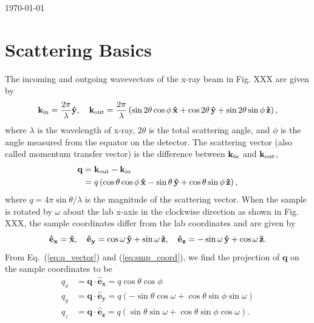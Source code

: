 \documentclass[12pt,letterpaper]{article}
\begin{document}
\today %
\section{Scattering Basics}
The incoming and outgoing wavevectors of the x-ray beam in Fig. XXX 
are given by
\begin{equation}
  \mathbf{k}_{\mathrm{in}} = \frac{2\pi}{\lambda} \mathbf{\hat{y}}, \quad
  \mathbf{k}_{\mathrm{out}} = 
    \frac{2\pi}{\lambda} \left( 
      \sin 2\theta \cos\phi \, \mathbf{\hat{x}}
      + \cos 2\theta \, \mathbf{\hat{y}}
      + \sin 2\theta \sin\phi \, \mathbf{\hat{z}} 
    \right),
\end{equation}
where $\lambda$ is the wavelength of x-ray, $2\theta$ is the total scattering
angle, and $\phi$ is the angle measured from the equator on the detector. 
The scattering vector (also called
momentum transfer vector) is
the difference between $\mathbf{k}_{\mathrm{in}}$ and $\mathbf{k}_{\mathrm{out}}$,
\begin{align}
  \mathbf{q} &= \mathbf{k}_{\mathrm{out}} - \mathbf{k}_{\mathrm{in}} \nonumber \\
             &= q \left( 
                  \cos\theta\cos\phi \, \mathbf{\hat{x}} - \sin\theta \, \mathbf{\hat{y}}
                  + \cos\theta\sin\phi \, \mathbf{\hat{z}}
                \right),
  \label{eq:q_vector}
\end{align}
where $q=4\pi\sin\theta/\lambda$ is the magnitude of the scattering vector. 
When the sample is rotated by $\omega$ about the lab x-axis in the clockwise 
direction as shown in Fig. XXX, the sample coordinates differ from the lab 
coordinates and are given by  
\begin{equation}
  \mathbf{\hat{e}_x} = \mathbf{\hat{x}}, \quad
  \mathbf{\hat{e}_y} = \cos\omega\,\mathbf{\hat{y}} + \sin\omega\,\mathbf{\hat{z}}, \quad
  \mathbf{\hat{e}_z} = -\sin\omega\,\mathbf{\hat{y}} + \cos\omega\,\mathbf{\hat{z}}.
  \label{eq:smp_coord}
\end{equation}
From Eq.~(\ref{eq:q_vector}) and (\ref{eq:smp_coord}), we find the projection of 
$\mathbf{q}$ on the sample coordinates to be
\begin{align}
  q_x &= \mathbf{q}\cdot\mathbf{\hat{e}_x} 
       = q\cos\theta\cos\phi 
       \nonumber\\
  q_y &= \mathbf{q}\cdot\mathbf{\hat{e}_y} 
       = q\left(-\sin\theta\cos\omega + \cos\theta\sin\phi\sin\omega\right) 
       \nonumber\\
  q_z &= \mathbf{q}\cdot\mathbf{\hat{e}_z} 
       = q\left(\sin\theta\sin\omega + \cos\theta\sin\phi\cos\omega\right).
       \label{eq:qxqyqz}
\end{align}
\end{document}
